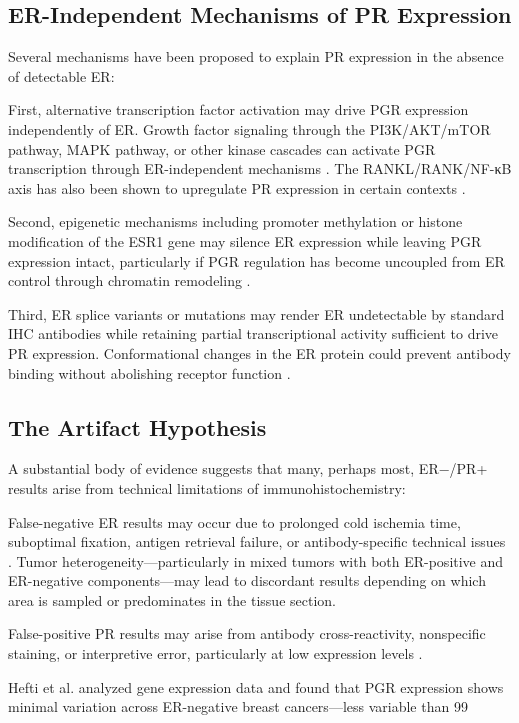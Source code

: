 \documentclass{article}
\begin{document}
\subsection{ER-Independent Mechanisms of PR Expression}

Several mechanisms have been proposed to explain PR expression in the absence of detectable ER:

First, alternative transcription factor activation may drive PGR expression independently of ER. Growth factor signaling through the PI3K/AKT/mTOR pathway, MAPK pathway, or other kinase cascades can activate PGR transcription through ER-independent mechanisms \citep{cui2005}. The RANKL/RANK/NF-κB axis has also been shown to upregulate PR expression in certain contexts \citep{gonzalez-suarez2010}.

Second, epigenetic mechanisms including promoter methylation or histone modification of the ESR1 gene may silence ER expression while leaving PGR expression intact, particularly if PGR regulation has become uncoupled from ER control through chromatin remodeling \citep{lapidus1996}.

Third, ER splice variants or mutations may render ER undetectable by standard IHC antibodies while retaining partial transcriptional activity sufficient to drive PR expression. Conformational changes in the ER protein could prevent antibody binding without abolishing receptor function \citep{kunc2018}.

\subsection{The Artifact Hypothesis}

A substantial body of evidence suggests that many, perhaps most, ER−/PR+ results arise from technical limitations of immunohistochemistry:

False-negative ER results may occur due to prolonged cold ischemia time, suboptimal fixation, antigen retrieval failure, or antibody-specific technical issues \citep{allison2020}. Tumor heterogeneity—particularly in mixed tumors with both ER-positive and ER-negative components—may lead to discordant results depending on which area is sampled or predominates in the tissue section.

False-positive PR results may arise from antibody cross-reactivity, nonspecific staining, or interpretive error, particularly at low expression levels \citep{hefti2014}.

Hefti et al. \citep{hefti2014} analyzed gene expression data and found that PGR expression shows minimal variation across ER-negative breast cancers—less variable than 99%
\end{document}
